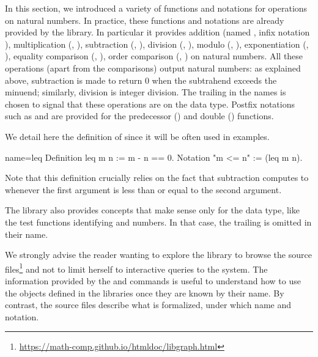 

In this section, we introduced a variety of functions and notations
for operations on natural numbers.  In practice, these functions and
notations are already provided by the \mcbMC{} library.  In particular
it provides addition (named , infix notation \C{+}),
multiplication
(, \C{*}), subtraction (, \C{-}), division (,
\C{\%/}),  modulo (, \C{\%\%}), exponentiation (, \C{\^}),
equality comparison (, \C{==}), order
comparison (, \C{<=}) on natural numbers.  All these operations
(apart from the comparisons)
output natural numbers: as explained above, subtraction is made to
return \(0\) when the subtrahend exceeds the minuend; similarly,
division is integer division.  The trailing  in
the names is chosen to signal that these operations are on the  data
type.  Postfix notations such as  and  are provided for
the predecessor () and double () functions.

We detail here the definition of  since it will be often used
in examples.

\begin{coq}{name=leq}{}
Definition leq m n := m - n == 0.
Notation "m <= n" := (leq m n).
\end{coq}

Note that this definition crucially relies on the fact that
subtraction computes to  whenever the first argument is less than
or equal to the second argument.

The \mcbMC{} library also provides concepts that make sense only
for the  data type, like the
test functions identifying  and  numbers. In that
case, the trailing  is omitted in their name.

We strongly advise the reader wanting to explore the \mcbMC{} library
to browse the source
files\footnote{\url{https://math-comp.github.io/htmldoc/libgraph.html}}
and not to limit herself to interactive queries to the system. The
information provided by the  and  commands is
useful to understand how to use the objects defined in the libraries
once they are known by their name. By contrast, the source
files describe what is formalized, under which name and notation.

